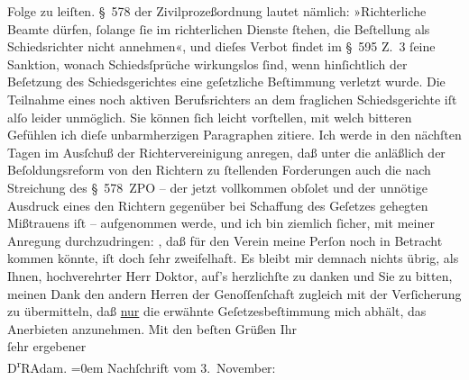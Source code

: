 \begin{ledgroupsized}[t]{13cm}
               Folge zu leiſten. § 578 der Zivilprozeßordnung lautet nämlich: »Richterliche Beamte
               dürfen, ſolange ſie im richterlichen Dienste ſtehen, die Beſtellung als
               Schiedsrichter nicht annehmen«, und dieſes Verbot findet im § 595 Z. 3 ſeine
               Sanktion, wonach Schiedsſprüche wirkungs{\pb}los ſind, wenn hinſichtlich der Beſetzung des Schiedsgerichtes eine geſetzliche
               Beſtimmung verletzt wurde. Die Teilnahme eines noch aktiven Berufsrichters an dem
               fraglichen Schiedsgerichte iſt alſo leider unmöglich.\pend
           \pstart
           Sie können ſich leicht vorſtellen, mit welch bitteren Gefühlen ich dieſe
               unbarmherzigen Paragraphen zitiere.\pend
           \pstart
           Ich werde in den nächſten Tagen im Ausſchuß der Richtervereinigung anregen, daß unter die anläßlich der Beſoldungsreform von
               den Richtern zu ſtellenden Forderungen auch die nach Streichung des § 578 ZPO – der
               jetzt vollkommen obſolet und der unnötige Ausdruck eines den Richtern gegenüber bei
               Schaffung des Geſetzes gehegten Mißtrauens iſt – aufgenommen werde, und ich bin
               ziemlich ſicher, mit meiner Anregung durchzudringen: \label{K_L02357-1v}\label{K_L02357-1h}, daß für den Verein meine Perſon noch in Betracht kommen
               könnte, iſt doch ſehr zweifelhaft.\pend
           \pstart
           {\pb}Es bleibt mir demnach nichts übrig, als
               Ihnen, hochverehrter Herr Doktor, auf’s herzlichſte zu danken und Sie zu bitten,
               meinen Dank den andern Herren der Genoſſenſchaft zugleich mit der Verſicherung zu übermitteln, daß \uline{nur} die erwähnte Geſetzesbeſtimmung mich abhält, das
               Anerbieten anzunehmen.\pend
           \pstart
           Mit den beſten Grüßen Ihr{\\[\baselineskip]}ſehr ergebener{\\[\baselineskip]}\spacefill\mbox{D\textsuperscript{r}RAdam.}\pend
           \leftskip=0em{}\pstart
           \noindent{}Nachſchrift vom 3. November:\pend

\end{ledgroupsized}
